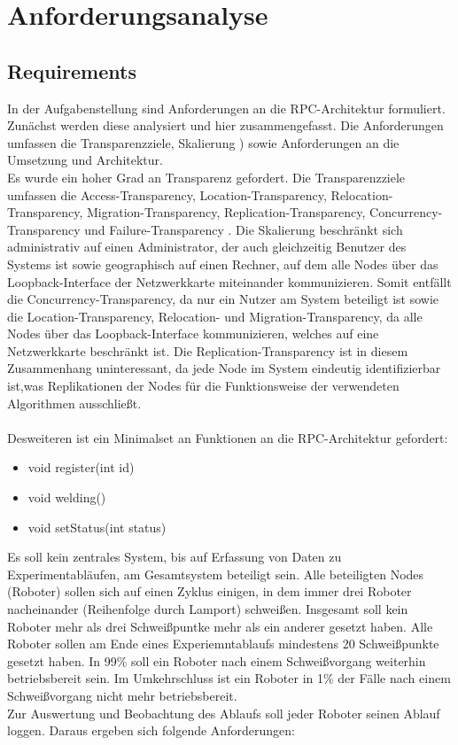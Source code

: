 %
\chapter{Anforderungsanalyse}

\section{Requirements}
In der Aufgabenstellung sind Anforderungen an die RPC-Architektur formuliert.
Zunächst werden diese analysiert und hier zusammengefasst.
Die Anforderungen umfassen die Transparenzziele, Skalierung \cite{tanenbaumvansteen}) sowie Anforderungen
an die Umsetzung und Architektur.\\
Es wurde ein hoher Grad an Transparenz gefordert.
Die Transparenzziele umfassen die Access-Transparency, Location-Transparency, Relocation-Transparency,
Migration-Transparency, Replication-Transparency, Concurrency-Transparency und Failure-Transparency \citep{tanenbaumvansteen}.
Die Skalierung beschränkt sich administrativ auf einen Administrator, der auch gleichzeitig
Benutzer des Systems ist sowie geographisch auf einen Rechner, auf dem alle Nodes 
\citep{tanenbaumvansteen} über das Loopback-Interface der Netzwerkkarte miteinander kommunizieren.
Somit entfällt die Concurrency-Transparency, da nur ein Nutzer am System beteiligt ist sowie die
Location-Transparency, Relocation- und Migration-Transparency, da alle Nodes über das Loopback-Interface
kommunizieren, welches auf eine Netzwerkkarte beschränkt ist. Die Replication-Transparency ist in diesem Zusammenhang 
uninteressant, da jede Node im System eindeutig identifizierbar ist,was Replikationen der Nodes für die Funktionsweise 
der verwendeten Algorithmen ausschließt.\\\\
Desweiteren ist ein Minimalset an Funktionen an die RPC-Architektur gefordert:
\begin{itemize}
  \item void register(int id)
  \item void welding()
  \item void setStatus(int status)
\end{itemize}
\newpage
Es soll kein zentrales System, bis auf Erfassung von Daten zu Experimentabläufen, am Gesamtsystem beteiligt
sein.
Alle beteiligten Nodes (Roboter) sollen sich auf einen Zyklus einigen, in dem immer drei Roboter nacheinander
(Reihenfolge durch Lamport) schweißen.
Insgesamt soll kein Roboter mehr als drei Schweißpuntke mehr als ein anderer gesetzt haben.
Alle Roboter sollen am Ende eines Experiemntablaufs mindestens 20 Schweißpunkte gesetzt haben.
In 99\% soll ein Roboter nach einem Schweißvorgang weiterhin betriebsbereit sein. Im Umkehrschluss
ist ein Roboter in 1\% der Fälle nach einem Schweißvorgang nicht mehr betriebsbereit.\\
Zur Auswertung und Beobachtung des Ablaufs soll jeder Roboter seinen Ablauf loggen.
Daraus ergeben sich folgende Anforderungen:

